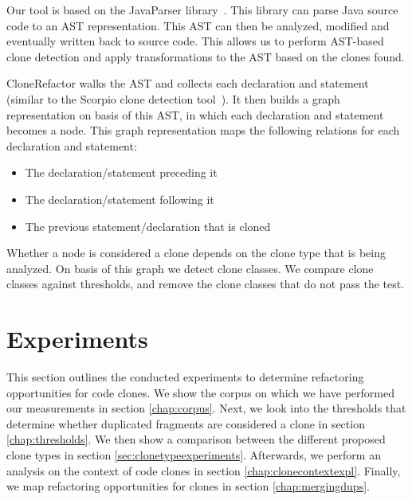 \documentclass[a4paper]{article}
\begin{document}

Our tool is based on the JavaParser library~\cite{tomassetti2017javaparser}. This library can parse Java source code to an AST representation. This AST can then be analyzed, modified and eventually written back to source code. This allows us to perform AST-based clone detection and apply transformations to the AST based on the clones found.

CloneRefactor walks the AST and collects each declaration and statement (similar to the Scorpio clone detection tool~\cite{higo2013revisiting}). It then builds a graph representation on basis of this AST, in which each declaration and statement becomes a node. This graph representation maps the following relations for each declaration and statement:

\begin{itemize}
  \item The declaration/statement preceding it
  \item The declaration/statement following it
  \item The previous statement/declaration that is cloned
\end{itemize}

Whether a node is considered a clone depends on the clone type that is being analyzed. On basis of this graph we detect clone classes. We compare clone classes against thresholds, and remove the clone classes that do not pass the test.

\section{Experiments}
This section outlines the conducted experiments to determine refactoring opportunities for code clones. We show the corpus on which we have performed our measurements in section \ref{chap:corpus}. Next, we look into the thresholds that determine whether duplicated fragments are considered a clone in section \ref{chap:thresholds}. We then show a comparison between the different proposed clone types in section \ref{sec:clonetypeexperiments}. Afterwards, we perform an analysis on the context of code clones in section \ref{chap:clonecontextexpl}. Finally, we map refactoring opportunities for clones in section \ref{chap:mergingdups}.
\end{document}
